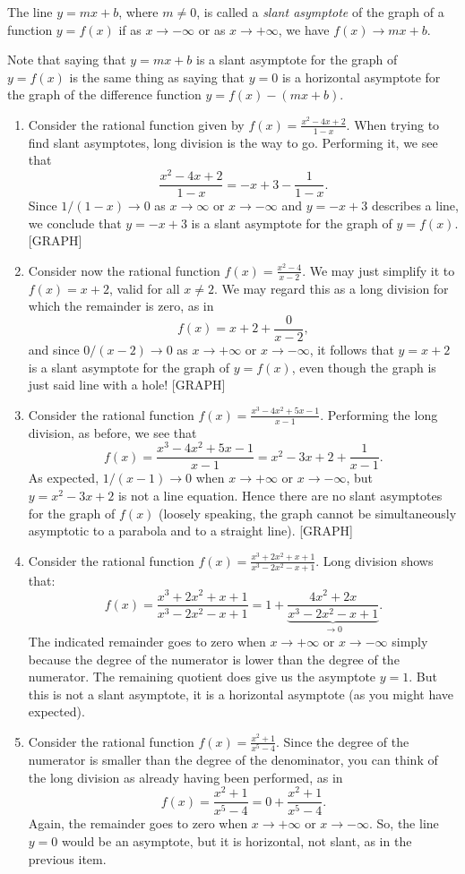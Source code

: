 \documentclass{ximera}
\begin{document}
\begin{definition}
  The line $y=mx+b$, where $m\neq 0$, is called a \emph{slant asymptote} of the graph of a function $y=f(x)$ if as $x \to -\infty$ or as $x\to +\infty$, we have $f(x) \to mx+b$.
\end{definition}

Note that saying that $y=mx+b$ is a slant asymptote for the graph of $y=f(x)$ is the same thing as saying that $y=0$ is a horizontal asymptote for the graph of the difference function $y=f(x)-(mx+b)$.

\begin{example}\mbox{}
  \begin{enumerate}
  \item Consider the rational function given by $f(x) = \frac{x^2-4x+2}{1-x}$. When trying to find slant asymptotes, long division is the way to go. Performing it, we see that \[    \frac{x^2-4x+2}{1-x} = -x+3 - \frac{1}{1-x}.  \]Since $1/(1-x) \to 0$ as $x \to \infty$ or $x \to -\infty$ and $y=-x+3$ describes a line, we conclude that $y=-x+3$ is a slant asymptote for the graph of $y=f(x)$. [GRAPH]
  \item Consider now the rational function $f(x) = \frac{x^2-4}{x-2}$. We may just simplify it to $f(x) = x+2$, valid for all $x \neq 2$. We may regard this as a long division for which the remainder is zero, as in \[  f(x) = x+2+\frac{0}{x-2},  \]and since $0/(x-2) \to 0$ as $x\to +\infty$ or $x\to -\infty$, it follows that $y=x+2$ is a slant asymptote for the graph of $y=f(x)$, even though the graph is just said line with a hole! [GRAPH]
  \item Consider the rational function $f(x)=\frac{x^3-4x^2+5x-1}{x-1}$. Performing the long division, as before, we see that \[   f(x) = \frac{x^3-4x^2+5x-1}{x-1} = x^2-3x+2 + \frac{1}{x-1}.  \]As expected, $1/(x-1) \to 0$ when $x \to +\infty$ or $x\to -\infty$, but $y=x^2-3x+2$ is not a line equation. Hence there are no slant asymptotes for the graph of $f(x)$ (loosely speaking, the graph cannot be simultaneously asymptotic to a parabola and to a straight line). [GRAPH]
  \item Consider the rational function $f(x) = \frac{x^3+2x^2+x+1}{x^3-2x^2-x+1}$. Long division shows that: \[   f(x) = \frac{x^3+2x^2+x+1}{x^3-2x^2-x+1} = 1 + \underbrace{\frac{4x^2+2x}{x^3-2x^2-x+1}}_{\to 0}.  \]The indicated remainder goes to zero when $x \to +\infty$ or $x\to -\infty$ simply because the degree of the numerator is lower than the degree of the numerator. The remaining quotient does give us the asymptote $y=1$. But this is not a slant asymptote, it is a horizontal asymptote (as you might have expected).
  \item Consider the rational function $f(x) = \frac{x^2+1}{x^5-4}$. Since the degree of the numerator is smaller than the degree of the denominator, you can think of the long division as already having been performed, as in \[ f(x) = \frac{x^2+1}{x^5-4} = 0 + \frac{x^2+1}{x^5-4}.  \]Again, the remainder goes to zero when $x \to +\infty$ or $x\to -\infty$. So, the line $y=0$ would be an asymptote, but it is horizontal, not slant, as in the previous item.
  \end{enumerate}


\end{example}
\end{document}
